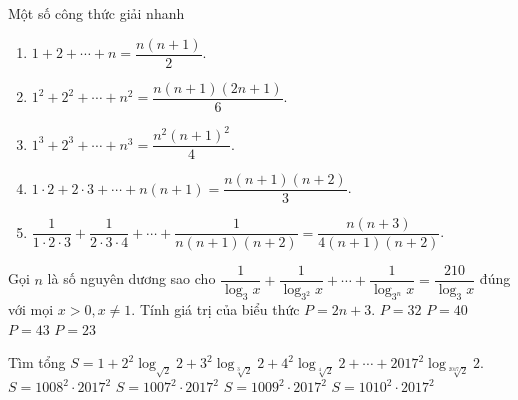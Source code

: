 \begin{dang}{Một số công thức giải nhanh}
	\begin{enumerate}
		\item $1+2+\cdots +n=\dfrac{n(n+1)}{2}$.
		\item $1^2+2^2+\cdots +n^2=\dfrac{n(n+1)(2n+1)}{6}$.
		\item $1^3+2^3+\cdots +n^3=\dfrac{n^2\left(n+1\right)^2}{4}$.
		\item $1\cdot 2+2\cdot 3+\cdots +n\left(n+1\right)=\dfrac{n\left(n+1\right)\left(n+2\right)}{3}$.
		\item $\dfrac{1}{1\cdot 2\cdot 3}+\dfrac{1}{2\cdot 3\cdot 4}+\cdots +\dfrac{1}{n\left(n+1\right)\left(n+2\right)}=\dfrac{n\left(n+3\right)}{4\left(n+1\right)\left(n+2\right)}$.
	\end{enumerate}
\end{dang}
\begin{vd}%
	Gọi $n$ là số nguyên dương sao cho $\dfrac{1}{\log_{ 3 } x}+\dfrac{1}{\log_{ 3^2 } x}+\cdots +\dfrac{1}{\log_{ 3^n } x}=\dfrac{210}{\log_{ 3 } x}$ đúng với mọi $x
	>0,x\ne 1$. Tính giá trị của biểu thức $P=2n+3$.
	\choice
	{$P=32$}
	{$P=40$}
	{\True $P=43$}
	{$P=23$}
\end{vd}
\begin{vd}%
	Tìm tổng $S=1+2^2\log_{ \sqrt{2} } 2+3^2\log_{ \sqrt[3]{2} } 2+4^2\log_{ \sqrt[4]{2} } 2+\cdots +2017^2\log_{ \sqrt[2017]{2} } 2$.
	\choice
	{$S=1008^2\cdot 2017^2$}
	{$S=1007^2\cdot 2017^2$}
	{\True $S=1009^2\cdot 2017^2$}
	{$S=1010^2\cdot 2017^2$}
\end{vd}

